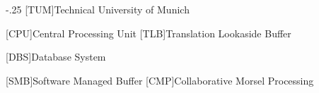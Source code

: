 \documentclass[headsepline,footsepline,footinclude=false,oneside,fontsize=11pt,paper=a4,listof=totoc,bibliography=totoc]{scrbook} %
\begin{document}


\frontmatter{}





\tableofcontents{}

\mainmatter{}







\appendix{}


\begin{acronym}
  \itemsep-.25\baselineskip
  [TUM]{Technical University of Munich}

  [CPU]{Central Processing Unit}
  [TLB]{Translation Lookaside Buffer}

  [DBS]{Database System}

  [SMB]{Software Managed Buffer}
  [CMP]{Collaborative Morsel Processing}
\end{acronym}

\newpage
{}
\listofalgorithms{}
\listoffigures{}
\listoftables{}
\printbibliography{}
\end{document}

